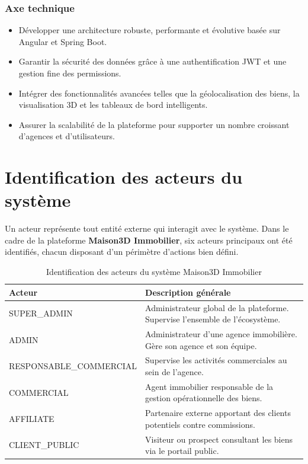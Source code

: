\documentclass[a4paper,12pt]{report}
\begin{document}
\subsubsection{Axe technique}

\begin{itemize}
    \item Développer une architecture robuste, performante et évolutive basée sur Angular et Spring Boot.
    \item Garantir la sécurité des données grâce à une authentification JWT et une gestion fine des permissions.
    \item Intégrer des fonctionnalités avancées telles que la géolocalisation des biens, la visualisation 3D et les tableaux de bord intelligents.
    \item Assurer la scalabilité de la plateforme pour supporter un nombre croissant d'agences et d'utilisateurs.
\end{itemize}


\section{Identification des acteurs du système}

Un acteur représente tout entité externe qui interagit avec le système. Dans le cadre de la plateforme \textbf{Maison3D Immobilier}, six acteurs principaux ont été identifiés, chacun disposant d'un périmètre d'actions bien défini.

\begin{table}[H]
\centering
\begin{tabular}{|p{4.5cm}|p{10cm}|}
\hline
\textbf{Acteur} & \textbf{Description générale} \\
\hline
SUPER\_ADMIN & Administrateur global de la plateforme. Supervise l'ensemble de l'écosystème. \\
\hline
ADMIN & Administrateur d'une agence immobilière. Gère son agence et son équipe. \\
\hline
RESPONSABLE\_COMMERCIAL & Supervise les activités commerciales au sein de l'agence. \\
\hline
COMMERCIAL & Agent immobilier responsable de la gestion opérationnelle des biens. \\
\hline
AFFILIATE & Partenaire externe apportant des clients potentiels contre commissions. \\
\hline
CLIENT\_PUBLIC & Visiteur ou prospect consultant les biens via le portail public. \\
\hline
\end{tabular}
\caption{Identification des acteurs du système Maison3D Immobilier}
\end{table}
\end{document}
